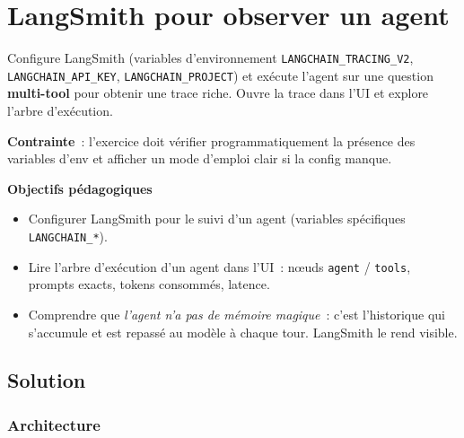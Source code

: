 \documentclass[11pt,a4paper]{article}
\begin{document}
\section{LangSmith pour observer un agent}

\begin{tcolorbox}[title=Exercice bonus 2. Tracer la boucle ReAct dans l'UI LangSmith]
Configure LangSmith (variables d'environnement \texttt{LANGCHAIN\_TRACING\_V2},
\texttt{LANGCHAIN\_API\_KEY}, \texttt{LANGCHAIN\_PROJECT}) et exécute
l'agent sur une question \textbf{multi-tool} pour obtenir une trace
riche. Ouvre la trace dans l'UI et explore l'arbre d'exécution.

\textbf{Contrainte}~: l'exercice doit vérifier programmatiquement la
présence des variables d'env et afficher un mode d'emploi clair si la
config manque.

\bigskip
\noindent\textbf{Objectifs pédagogiques}
\begin{itemize}[leftmargin=*]
  \item Configurer LangSmith pour le suivi d'un agent (variables
        spécifiques \texttt{LANGCHAIN\_*}).
  \item Lire l'arbre d'exécution d'un agent dans l'UI~: nœuds
        \texttt{agent} / \texttt{tools}, prompts exacts, tokens
        consommés, latence.
  \item Comprendre que \emph{l'agent n'a pas de mémoire magique}~: c'est
        l'historique qui s'accumule et est repassé au modèle à chaque
        tour. LangSmith le rend visible.
\end{itemize}
\end{tcolorbox}

\subsection{Solution}

\subsubsection{Architecture}

\begin{center}
\end{center}
\end{document}
